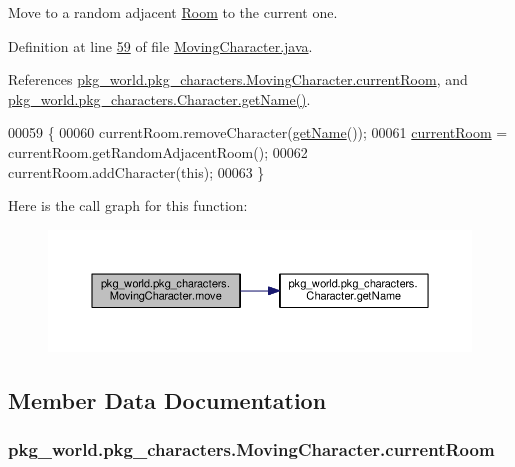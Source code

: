 Move to a random adjacent \hyperlink{classpkg__world_1_1Room}{Room} to the current one. 



Definition at line \hyperlink{MovingCharacter_8java_source_l00059}{59} of file \hyperlink{MovingCharacter_8java_source}{Moving\-Character.\-java}.



References \hyperlink{MovingCharacter_8java_source_l00016}{pkg\-\_\-world.\-pkg\-\_\-characters.\-Moving\-Character.\-current\-Room}, and \hyperlink{Character_8java_source_l00132}{pkg\-\_\-world.\-pkg\-\_\-characters.\-Character.\-get\-Name()}.


\begin{DoxyCode}
00059                        \{
00060         currentRoom.removeCharacter(\hyperlink{classpkg__world_1_1pkg__characters_1_1Character_a660097e198e2e62f83d83a8872eb55d1}{getName}());
00061         \hyperlink{classpkg__world_1_1pkg__characters_1_1MovingCharacter_abef44df79f5b66a48f5bacc6e0f29c54}{currentRoom} = currentRoom.getRandomAdjacentRoom();
00062         currentRoom.addCharacter(\textcolor{keyword}{this});
00063     \}
\end{DoxyCode}


Here is the call graph for this function\-:
\nopagebreak
\begin{figure}[H]
\begin{center}
\leavevmode
\includegraphics[width=350pt]{classpkg__world_1_1pkg__characters_1_1MovingCharacter_aaf4df04191a12b44ecf4d5e127c3a969_cgraph}
\end{center}
\end{figure}




\subsection{Member Data Documentation}
\hypertarget{classpkg__world_1_1pkg__characters_1_1MovingCharacter_abef44df79f5b66a48f5bacc6e0f29c54}{
\subsubsection[{current\-Room}]{ pkg\-\_\-world.\-pkg\-\_\-characters.\-Moving\-Character.\-current\-Room\hspace{0.3cm}{\ttfamily [private]}}}\label{classpkg__world_1_1pkg__characters_1_1MovingCharacter_abef44df79f5b66a48f5bacc6e0f29c54}


